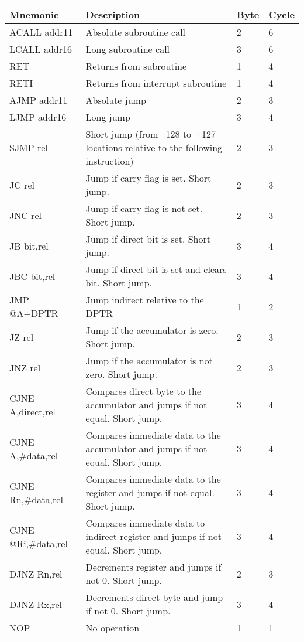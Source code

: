 \documentclass[
]{article}
\begin{document}
\begin{longtable}[]{@{}llll@{}}
\toprule
\textbf{Mnemonic} & \textbf{Description} & \textbf{Byte} &
\textbf{Cycle} \\
\midrule
\endhead
ACALL addr11 & Absolute subroutine call & 2 & 6 \\
LCALL addr16 & Long subroutine call & 3 & 6 \\
RET & Returns from subroutine & 1 & 4 \\
RETI & Returns from interrupt subroutine & 1 & 4 \\
AJMP addr11 & Absolute jump & 2 & 3 \\
LJMP addr16 & Long jump & 3 & 4 \\
SJMP rel & Short jump (from --128 to +127 locations relative to the
following instruction) & 2 & 3 \\
JC rel & Jump if carry flag is set. Short jump. & 2 & 3 \\
JNC rel & Jump if carry flag is not set. Short jump. & 2 & 3 \\
JB bit,rel & Jump if direct bit is set. Short jump. & 3 & 4 \\
JBC bit,rel & Jump if direct bit is set and clears bit. Short jump. & 3
& 4 \\
JMP @A+DPTR & Jump indirect relative to the DPTR & 1 & 2 \\
JZ rel & Jump if the accumulator is zero. Short jump. & 2 & 3 \\
JNZ rel & Jump if the accumulator is not zero. Short jump. & 2 & 3 \\
CJNE A,direct,rel & Compares direct byte to the accumulator and jumps if
not equal. Short jump. & 3 & 4 \\
CJNE A,\#data,rel & Compares immediate data to the accumulator and jumps
if not equal. Short jump. & 3 & 4 \\
CJNE Rn,\#data,rel & Compares immediate data to the register and jumps
if not equal. Short jump. & 3 & 4 \\
CJNE @Ri,\#data,rel & Compares immediate data to indirect register and
jumps if not equal. Short jump. & 3 & 4 \\
DJNZ Rn,rel & Decrements register and jumps if not 0. Short jump. & 2 &
3 \\
DJNZ Rx,rel & Decrements direct byte and jump if not 0. Short jump. & 3
& 4 \\
NOP & No operation & 1 & 1 \\
\bottomrule
\end{longtable}
\end{document}
